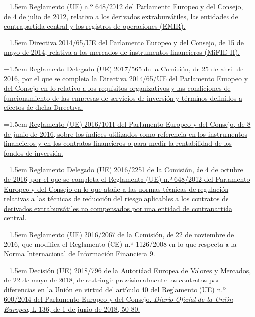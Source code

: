 \documentclass[10pt,a4paper]{article}
\begin{document}
\noindent\hangindent=1.5em \href{https://eur-lex.europa.eu/eli/reg/2012/648/oj}{Reglamento (UE) n.º 648/2012 del Parlamento Europeo y del Consejo, de 4 de julio de 2012, relativo a los derivados extrabursátiles, las entidades de contrapartida central y los registros de operaciones (EMIR).}

\noindent\hangindent=1.5em \href{https://eur-lex.europa.eu/eli/dir/2014/65/oj}{Directiva 2014/65/UE del Parlamento Europeo y del Consejo, de 15 de mayo de 2014, relativa a los mercados de instrumentos financieros (MiFID II).}

\noindent\hangindent=1.5em \href{https://eur-lex.europa.eu/eli/reg_del/2017/565/oj}{Reglamento Delegado (UE) 2017/565 de la Comisión, de 25 de abril de 2016, por el que se completa la Directiva 2014/65/UE del Parlamento Europeo y del Consejo en lo relativo a los requisitos organizativos y las condiciones de funcionamiento de las empresas de servicios de inversión y términos definidos a efectos de dicha Directiva.}

\noindent\hangindent=1.5em \href{https://eur-lex.europa.eu/eli/reg/2016/1011/oj}{Reglamento (UE) 2016/1011 del Parlamento Europeo y del Consejo, de 8 de junio de 2016, sobre los índices utilizados como referencia en los instrumentos financieros y en los contratos financieros o para medir la rentabilidad de los fondos de inversión.}

\noindent\hangindent=1.5em \href{https://eur-lex.europa.eu/eli/reg_del/2016/2251/oj}{Reglamento Delegado (UE) 2016/2251 de la Comisión, de 4 de octubre de 2016, por el que se completa el Reglamento (UE) n.º 648/2012 del Parlamento Europeo y del Consejo en lo que atañe a las normas técnicas de regulación relativas a las técnicas de reducción del riesgo aplicables a los contratos de derivados extrabursátiles no compensados por una entidad de contrapartida central.}

\noindent\hangindent=1.5em \href{https://eur-lex.europa.eu/eli/reg/2016/2067/oj}{Reglamento (UE) 2016/2067 de la Comisión, de 22 de noviembre de 2016, que modifica el Reglamento (CE) n.º 1126/2008 en lo que respecta a la Norma Internacional de Información Financiera 9.}

\noindent\hangindent=1.5em \href{https://eur-lex.europa.eu/eli/dec/2018/796/oj}{Decisión (UE) 2018/796 de la Autoridad Europea de Valores y Mercados, de 22 de mayo de 2018, de restringir provisionalmente los contratos por diferencias en la Unión en virtud del artículo 40 del Reglamento (UE) n.º 600/2014 del Parlamento Europeo y del Consejo. \textit{Diario Oficial de la Unión Europea}, L 136, de 1 de junio de 2018, 50-80.}
\end{document}
